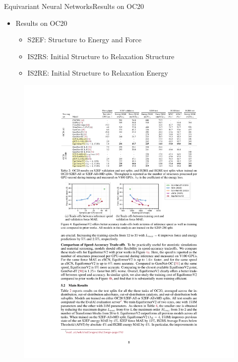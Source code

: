 \documentclass[pdf,serif]{beamer}
\begin{document}
\begin{frame}{Equivariant Neural Networks}{Results on OC20}
    \begin{itemize}
        \item Results on OC20 \citep{ocp_dataset}
        \begin{itemize}
            \item S2EF: Structure to Energy and Force
            \item IS2RS: Initial Structure to Relaxation Structure
            \item IS2RE: Initial Structure to Relaxation Energy
        \end{itemize}
    \end{itemize}
    \vspace*{1em}
    \begin{figure}
        \includegraphics[width=\linewidth]{images/resoc}
    \end{figure}
\end{frame}
\end{document}
